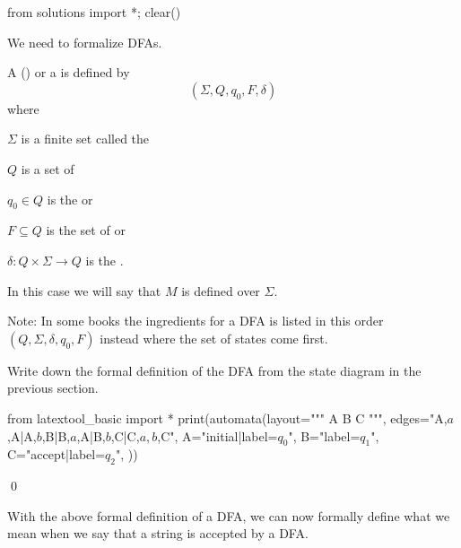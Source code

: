 \begin{python0}
from solutions import *; clear()
\end{python0}

We need to formalize DFAs.

\begin{defn}
  A 
  (\sidebarskip{16pt})
  or a
  \sidebarskip{8pt}\sidebarskip{4pt}
  is defined by
  \[
  (\Sigma,Q,q_0,F,\delta)
  \]
  where
  \begin{tightlist}
  \item $\Sigma$ is a finite set called the
  \item $Q$ is a set of 
  \item $q_0 \in Q$ is the
    or
    \sidebarskip{12pt}
  \item $F \subseteq Q$ is the set of 
    or
    \sidebarskip{18pt}
  \item $\delta : Q \times \Sigma \rightarrow Q$ is the
    .
  \end{tightlist}
  In this case we will say that $M$ is defined over $\Sigma$.
\end{defn}

Note: In some books the ingredients
for a DFA is listed in this order $(Q, \Sigma, \delta, q_0, F)$
instead where the set of states come first.


\newpage
\begin{ex}
  Write down the formal definition of the DFA from the
  state diagram in the previous section.
\begin{python}
from latextool_basic import *
print(automata(layout="""
A  B  C
""",
edges="A,$a$,A|A,$b$,B|B,$a$,A|B,$b$,C|C,$a,b$,C",
A="initial|label=$q_0$",
B="label=$q_1$",
C="accept|label=$q_2$",
))
\end{python}
\qed
\end{ex}


\newpage
With the above formal definition of a DFA, we can now formally
define what we mean when we say that a string is accepted by a
DFA.

